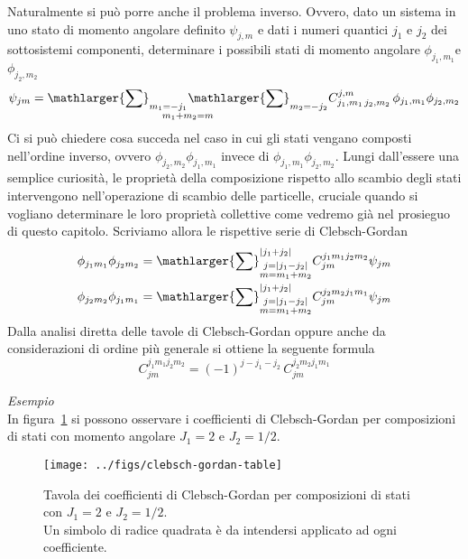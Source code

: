 Naturalmente si può porre anche il problema inverso.
Ovvero, dato un sistema in uno stato di momento angolare definito $\psi_{j,m}$ e dati i numeri quantici $j_{1}$ e $j_{2}$ dei sottosistemi componenti, determinare i possibili stati di momento angolare  $\phi_{j_{1},m_{1}}$e $\phi_{j_{2},m_{2}}$
\begin{equation}
    \psi_{jm} =  \underset{m_{1}+m_{2}=m}{\mathlarger{\sum}_{m_{1}=-j_{1}} \mathlarger{\sum}_{ m_{2}=-j_{2}}}
    C^{j,m}_{j_{1},m_{1} \, j_{2},m_{2}} \, \phi_{j_{1},m_{1}}\phi_{j_{2},m_{2}}
    \label{eq:inverse-clebsch-gordan}
\end{equation}
Ci si può chiedere cosa succeda nel caso in cui gli stati vengano composti nell’ordine inverso, ovvero $\phi_{j_{2},m_{2}} \phi_{j_{1},m_{1}}$ invece di $\phi_{j_{1},m_{1}}\phi_{j_{2},m_{2}}$.
Lungi dall’essere una semplice curiosità, le proprietà della composizione rispetto allo scambio degli stati intervengono nell’operazione di scambio delle particelle, cruciale quando si vogliano determinare le loro proprietà collettive come vedremo già nel prosieguo di questo capitolo.
Scriviamo allora le rispettive serie di Clebsch-Gordan
\begin{gather*}
    \phi_{j_{1}m_{1}} \phi_{j_{2}m_{2}} = \mathlarger{\sum}_{\substack{j=| j_{1}-j_{2}| \\ m = m_{1}+m_{2}} }^{| j_{1}+j_{2}|} C_{jm}^{j_{1}m_{1}j_{2}m_{2}} \psi_{jm}\\
    \phi_{j_{2}m_{2}} \phi_{j_{1}m_{1}} = \mathlarger{\sum}_{\substack{j=| j_{1}-j_{2}| \\ m = m_{1}+m_{2}} }^{| j_{1}+j_{2}|} C_{jm}^{j_{2}m_{2}j_{1}m_{1}} \psi_{jm}
\end{gather*}
Dalla analisi diretta delle tavole di Clebsch-Gordan oppure anche da considerazioni di ordine più generale si ottiene la seguente formula
\[
    C_{jm}^{j_{1}m_{1}j_{2}m_{2}} = (-1)^{j-j_1-j_2} \, C_{jm}^{j_{2}m_{2}j_{1}m_{1}}
\]
\bigskip

\emph{Esempio} \\
In figura~\ref{fig:clebsch-gordan-table} si possono osservare i coefficienti di Clebsch-Gordan per composizioni di stati con
momento angolare $J_1=2$ e $ J_2 = 1/2$.
\begin{figure}
    \centering
    \texttt{[image: ../figs/clebsch-gordan-table]}
    \caption{Tavola dei coefficienti di Clebsch-Gordan per composizioni di stati con
        $J_1=2$ e $ J_2 = 1/2$. \\
        Un simbolo di radice quadrata è da intendersi applicato ad ogni coefficiente.}
    \label{fig:clebsch-gordan-table}
\end{figure}

